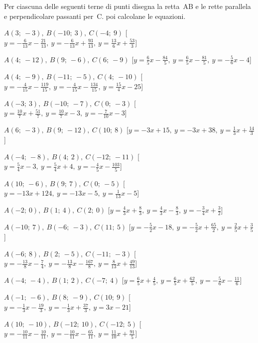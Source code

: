 \begin{esercizio}\label{ese:}
 Per ciascuna delle seguenti terne di 
punti disegna la retta~AB e le rette parallela e perpendicolare passanti 
per~C. poi calcolane le equazioni.
 \begin{enumeratea}
  \item  $A(3;~-3),~B(-10;~3),~C(-4;~9)$ \hfill 
   [$y = -\frac{6}{13} x -\frac{21}{13},~y = -\frac{6}{13} x +\frac{93}{13},~y = \frac{13}{6} x +\frac{53}{3}$]
  \item  $A(4;~-12),~B(9;~-6),~C(6;~-9)$ \hfill 
   [$y = \frac{6}{5} x -\frac{84}{5},~y = \frac{6}{5} x -\frac{81}{5},~y = -\frac{5}{6} x -4$]
  \item  $A(4;~-9),~B(-11;~-5),~C(4;~-10)$ \hfill 
   [$y = -\frac{4}{15} x -\frac{119}{15},~y = -\frac{4}{15} x -\frac{134}{15},~y = \frac{15}{4} x -25$]
  \item  $A(-3;~3),~B(-10;~-7),~C(0;~-3)$ \hfill 
   [$y = \frac{10}{7} x +\frac{51}{7},~y = \frac{10}{7} x -3,~y = -\frac{7}{10} x -3$]
  \item  $A(6;~-3),~B(9;~-12),~C(10;~8)$ \hfill 
   [$y = -3 x +15,~y = -3 x +38,~y = \frac{1}{3} x +\frac{14}{3}$]
  \item  $A(-4;~-8),~B(4;~2),~C(-12;~-11)$ \hfill 
   [$y = \frac{5}{4} x -3,~y = \frac{5}{4} x +4,~y = -\frac{4}{5} x -\frac{103}{5}$]
  \item  $A(10;~-6),~B(9;~7),~C(0;~-5)$ \hfill 
   [$y = -13 x +124,~y = -13 x -5,~y = \frac{1}{13} x -5$]
  \item  $A(-2;~0),~B(1;~4),~C(2;~0)$ \hfill 
   [$y = \frac{4}{3} x +\frac{8}{3},~y = \frac{4}{3} x -\frac{8}{3},~y = -\frac{3}{4} x +\frac{3}{2}$]
  \item  $A(-10;~7),~B(-6;~-3),~C(11;~5)$ \hfill 
   [$y = -\frac{5}{2} x -18,~y = -\frac{5}{2} x +\frac{65}{2},~y = \frac{2}{5} x +\frac{3}{5}$]
  \item  $A(-6;~8),~B(2;~-5),~C(-11;~-3)$ \hfill 
   [$y = -\frac{13}{8} x -\frac{7}{4},~y = -\frac{13}{8} x -\frac{167}{8},~y = \frac{8}{13} x +\frac{49}{13}$]
  \item  $A(-4;~-4),~B(1;~2),~C(-7;~4)$ \hfill 
   [$y = \frac{6}{5} x +\frac{4}{5},~y = \frac{6}{5} x +\frac{62}{5},~y = -\frac{5}{6} x -\frac{11}{6}$]
  \item  $A(-1;~-6),~B(8;~-9),~C(10;~9)$ \hfill 
   [$y = -\frac{1}{3} x -\frac{19}{3},~y = -\frac{1}{3} x +\frac{37}{3},~y = 3 x -21$]
  \item  $A(10;~-10),~B(-12;~10),~C(-12;~5)$ \hfill 
   [$y = -\frac{10}{11} x -\frac{10}{11},~y = -\frac{10}{11} x -\frac{65}{11},~y = \frac{11}{10} x +\frac{91}{5}$]

\end{enumeratea}
\end{esercizio}
